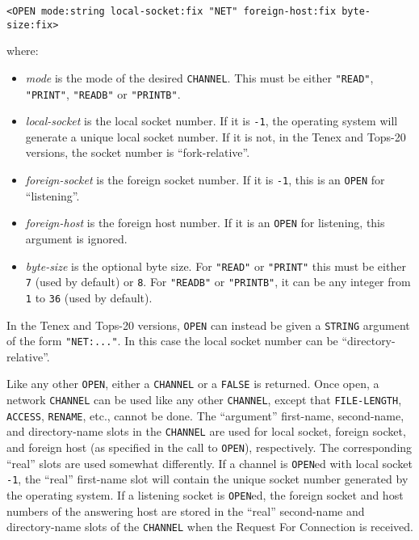 \documentclass[a4paper]{scrbook}
\providecommand{\tightlist}{%
  \setlength{\itemsep}{0pt}\setlength{\parskip}{0pt}}
\begin{document}
\begin{verbatim}
<OPEN mode:string local-socket:fix "NET" foreign-host:fix byte-size:fix>
\end{verbatim}

where:

\begin{itemize}
\tightlist
\item
  \emph{mode} is the mode of the desired \texttt{CHANNEL}. This must be either \texttt{"READ"}, \texttt{"PRINT"},
  \texttt{"READB"} or \texttt{"PRINTB"}.
\item
  \emph{local-socket} is the local socket number. If it is \texttt{-1}, the operating system will generate a unique local
  socket number. If it is not, in the Tenex  and Tops-20  versions, the
  socket number is ``fork-relative''.
\item
  \emph{foreign-socket} is the foreign socket number. If it is \texttt{-1}, this is an \texttt{OPEN} for ``listening''.
\item
  \emph{foreign-host} is the foreign host number. If it is an \texttt{OPEN} for listening, this argument is ignored.
\item
  \emph{byte-size} is the optional byte size. For \texttt{"READ"} or \texttt{"PRINT"} this must be either \texttt{7} (used
  by default) or \texttt{8}. For \texttt{"READB"} or \texttt{"PRINTB"}, it can be any integer from \texttt{1} to
  \texttt{36} (used by default).
\end{itemize}

In the Tenex and Tops-20 versions, \texttt{OPEN} can instead be given a \texttt{STRING} argument of the form
\texttt{"NET:..."}. In this case the local socket number can be ``directory-relative''.

Like any other \texttt{OPEN}, either a \texttt{CHANNEL} or a \texttt{FALSE} is returned. Once open, a network
\texttt{CHANNEL} can be used like any other \texttt{CHANNEL}, except that \texttt{FILE-LENGTH}, \texttt{ACCESS},
\texttt{RENAME}, etc., cannot be done. The ``argument'' first-name, second-name, and directory-name slots in the
\texttt{CHANNEL} are used for local socket, foreign socket, and foreign host (as specified in the call to \texttt{OPEN}),
respectively. The corresponding ``real'' slots are used somewhat differently. If a channel is \texttt{OPEN}ed with local
socket \texttt{-1}, the ``real'' first-name slot will contain the unique socket number generated by the operating system.
If a listening socket is \texttt{OPEN}ed, the foreign socket and host numbers of the answering host are stored in the
``real'' second-name and directory-name slots of the \texttt{CHANNEL} when the Request For Connection is received.
\end{document}
